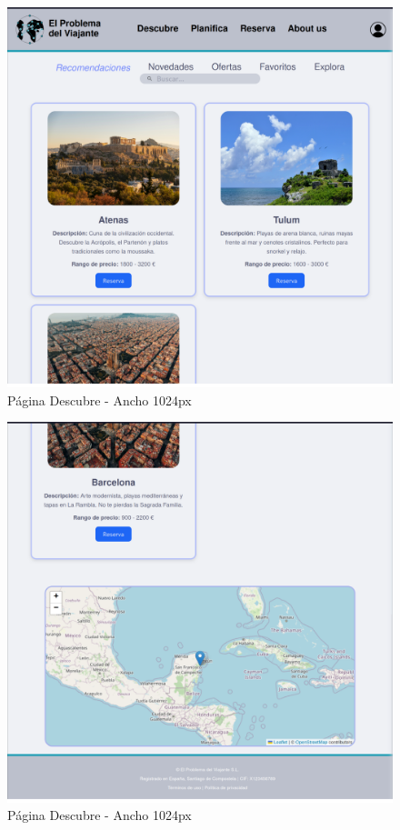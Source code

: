 \documentclass[11pt, a4paper]{book}
\begin{document}
	\begin{figure} [H]
		\centering
		\includegraphics[height=0.4\textheight]{CSS/4-3 1024.png}
		\caption{Página Descubre - Ancho 1024px}
	\end{figure}
	\begin{figure} [H]
		\centering
		\includegraphics[height=0.4\textheight]{CSS/4-4 1024.png}
		\caption{Página Descubre - Ancho 1024px}
	\end{figure}
\end{document}

